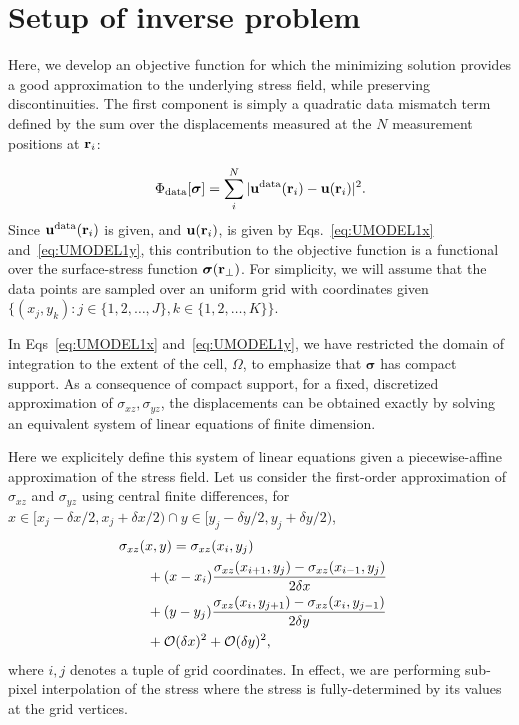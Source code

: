 \documentclass[aps,prl,reprint,twocolumn,groupedaddress,showpacs]{revtex4-1}
\def\r{{\bf r}}
\def\u{{\bf u}}
\newcommand{\bs}{\boldsymbol{\sigma}}
\begin{document}
%




\section{Setup of inverse problem}

Here, we develop an objective function for which the minimizing
solution provides a good approximation to the underlying stress
field, while preserving discontinuities.
 The first component is simply a quadratic data mismatch term
defined by the sum over the displacements measured at the $N$
measurement positions at $\r_{i}$:


\begin{equation}
\Phi_{\rm data}[\bs] = \sum_{i}^{N}\vert \u^{\rm
  data}(\r_{i})- \u(\r_i)\vert^{2}.
\end{equation}
%
Since $\u^{\rm data}(\r_{i})$ is given, and $\u(\r_{i})$, is given by
Eqs.~\ref{eq:UMODEL1x} and~\ref{eq:UMODEL1y}, this contribution to the objective function is a
functional over the surface-stress function $\bs(\r_{\perp})$.  For simplicity, we will assume that 
the data points are sampled over an uniform grid with coordinates given $\{ (x_j,y_k) : j\in\{1,2,\ldots,J\}, k\in\{1,2,\ldots,K\}\}.$

In Eqs~\ref{eq:UMODEL1x} and~\ref{eq:UMODEL1y}, we have restricted the domain of integration to the extent of the cell, $\Omega$, to emphasize that  $\boldsymbol\sigma$ has compact support. As a consequence of compact support, for a fixed, discretized approximation of $\sigma_{xz},\sigma_{yz}$, the displacements can be obtained exactly by solving an equivalent system of linear equations of finite dimension.

Here we explicitely define this system of linear equations given a piecewise-affine approximation of the stress field. Let us consider the first-order approximation of $\sigma_{xz}$ and $\sigma_{yz}$ using central finite differences, for $x\in[x_j - \delta x/2, x_j+\delta x/2) \cap y\in[y_j-\delta y/2, y_j + \delta y /2)$,
\begin{align}
\lefteqn{\sigma_{xz}(x,y) =\sigma_{xz}(x_i , y_j)  }\nonumber \\
& \qquad+ (x-x_i)\frac{\sigma_{xz}(x_{i+1},y_j) -\sigma_{xz}(x_{i-1},y_j) }{2\delta x}  \nonumber\\
&\qquad + (y-y_j)\frac{\sigma_{xz}(x_i,y_{j+1}) - \sigma_{xz}(x_i,y_{j-1}) }{2\delta y} \nonumber\\
&\qquad + \mathcal{O}(\delta x)^2 + \mathcal{O}(\delta y)^2,\label{eq:sigma_affine}
\end{align}
where $i,j$ denotes a tuple of grid coordinates. In effect, we are performing sub-pixel interpolation of the stress where the stress is fully-determined by its values at the grid vertices.
\end{document}
